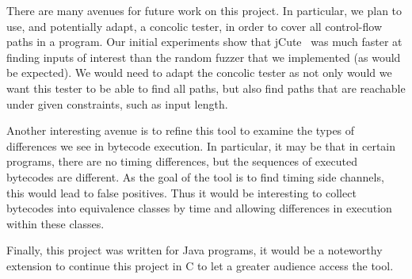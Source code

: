 There are many avenues for future work on this project. In particular, 
we plan to use, and potentially adapt, a concolic tester, in order to
cover all control-flow paths in a program. Our initial experiments
show that jCute~\cite{Sen2006} was much faster
at finding inputs of interest than the random fuzzer that we
implemented (as would be expected). We would need to adapt the
concolic tester as not only would we want this tester to
be able to find all paths, but also find paths that are reachable under
given constraints, such as input length. 

Another interesting avenue is to refine this tool to examine the types
of differences we see in bytecode execution. In particular, it may be
that in certain programs, there are no timing
differences, but the sequences of executed bytecodes are different. As
the goal of the tool is to find timing side channels, this would lead to
false positives. Thus it would be interesting to 
collect bytecodes into equivalence classes by time and allowing
differences in execution within these classes. 

Finally, this project was written for Java programs, it would be a noteworthy
extension to continue this project in C to let a greater audience
access the tool. 
